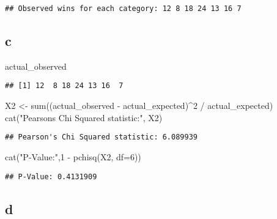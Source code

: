 \documentclass[
]{article}
\newenvironment{Shaded}{\begin{snugshade}}{\end{snugshade}}
\newcommand{\AttributeTok}[1]{\textcolor[rgb]{0.77,0.63,0.00}{#1}}
\newcommand{\DecValTok}[1]{\textcolor[rgb]{0.00,0.00,0.81}{#1}}
\newcommand{\FunctionTok}[1]{\textcolor[rgb]{0.00,0.00,0.00}{#1}}
\newcommand{\NormalTok}[1]{#1}
\newcommand{\OtherTok}[1]{\textcolor[rgb]{0.56,0.35,0.01}{#1}}
\newcommand{\SpecialCharTok}[1]{\textcolor[rgb]{0.00,0.00,0.00}{#1}}
\newcommand{\StringTok}[1]{\textcolor[rgb]{0.31,0.60,0.02}{#1}}
\begin{document}
\begin{verbatim}
## Observed wins for each category: 12 8 18 24 13 16 7
\end{verbatim}

\hypertarget{c}{%
\subsection{c}\label{c}}

\begin{Shaded}
\begin{Highlighting}[]
\NormalTok{actual\_observed}
\end{Highlighting}
\end{Shaded}

\begin{verbatim}
## [1] 12  8 18 24 13 16  7
\end{verbatim}

\begin{Shaded}
\begin{Highlighting}[]
\NormalTok{X2 }\OtherTok{\textless{}{-}} \FunctionTok{sum}\NormalTok{((actual\_observed }\SpecialCharTok{{-}}\NormalTok{ actual\_expected)}\SpecialCharTok{\^{}}\DecValTok{2} \SpecialCharTok{/}\NormalTok{ actual\_expected)}
\FunctionTok{cat}\NormalTok{(}\StringTok{"Pearson\textquotesingle{}s Chi Squared statistic:"}\NormalTok{, X2)}
\end{Highlighting}
\end{Shaded}

\begin{verbatim}
## Pearson's Chi Squared statistic: 6.089939
\end{verbatim}

\begin{Shaded}
\begin{Highlighting}[]
\FunctionTok{cat}\NormalTok{(}\StringTok{"P{-}Value:"}\NormalTok{,}\DecValTok{1} \SpecialCharTok{{-}} \FunctionTok{pchisq}\NormalTok{(X2, }\AttributeTok{df=}\DecValTok{6}\NormalTok{))}
\end{Highlighting}
\end{Shaded}

\begin{verbatim}
## P-Value: 0.4131909
\end{verbatim}

\hypertarget{d}{%
\subsection{d}\label{d}}
\end{document}

